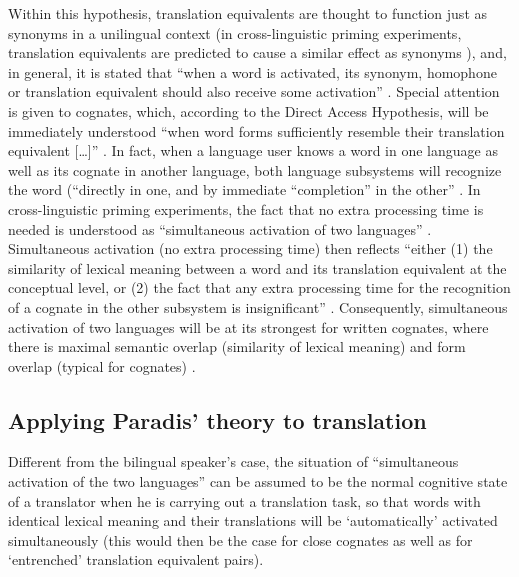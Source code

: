 Within this hypothesis, translation equivalents are thought to function just as synonyms in a unilingual context (in cross-linguistic priming experiments, translation equivalents are predicted to cause a similar effect as synonyms \citep[219]{paradis_neurolinguistic_2004}), and, in general, it is stated that “when a word is activated, its synonym, homophone or translation equivalent should also receive some activation” \citep[219]{paradis_neurolinguistic_2004}. Special attention is given to cognates, which, according to the Direct Access Hypothesis, will be immediately understood “when word forms sufficiently resemble their translation equivalent […]” \citep[218]{paradis_neurolinguistic_2004}. In fact, when a language user knows a word in one language as well as its cognate in another language, both language subsystems will recognize the word (“directly in one, and by immediate “completion” in the other” \citep[218]{paradis_neurolinguistic_2004}. In cross-linguistic priming experiments, the fact that no extra processing time is needed is understood as “simultaneous activation of two languages” \citep[219]{paradis_neurolinguistic_2004}. Simultaneous activation (no extra processing time) then reflects “either (1) the similarity of lexical meaning between a word and its translation equivalent at the conceptual level, or (2) the fact that any extra processing time for the recognition of a cognate in the other subsystem is insignificant” \citep[219]{paradis_neurolinguistic_2004}. Consequently, simultaneous activation of two languages will be at its strongest for written cognates, where there is maximal semantic overlap (similarity of lexical meaning) and form overlap (typical for cognates) \citep[219]{paradis_neurolinguistic_2004}.

\subsection{Applying Paradis’ theory to translation}
\label{sec:5.3.2}  
Different from the bilingual speaker’s case, the situation of “simultaneous activation of the two languages” can be assumed to be the normal cognitive state of a translator when he is carrying out a translation task, so that words with identical lexical meaning and their translations will be ‘automatically’ activated simultaneously (this would then be the case for close cognates as well as for ‘entrenched’ translation equivalent pairs).

